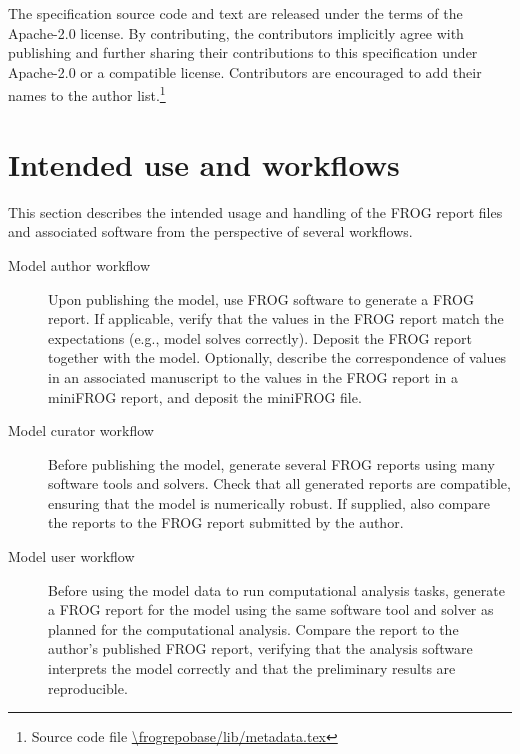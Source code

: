 The specification source code and text are released under the terms of the Apache-2.0 license.
By contributing, the contributors implicitly agree with publishing and further sharing their contributions to this specification under Apache-2.0 or a compatible license.
Contributors are encouraged to add their names to the author list.\footnote{Source code file \url{\frogrepobase/lib/metadata.tex}}

\section{Intended use and workflows}

This section describes the intended usage and handling of the FROG report files and associated software from the perspective of several workflows.

\begin{description}
\item[Model author workflow] Upon publishing the model, use FROG software to generate a FROG report.
If applicable, verify that the values in the FROG report match the expectations (e.g., model solves correctly).
Deposit the FROG report together with the model.
Optionally, describe the correspondence of values in an associated manuscript to the values in the FROG report in a miniFROG report, and deposit the miniFROG file.
\item[Model curator workflow] Before publishing the model, generate several FROG reports using many software tools and solvers.
Check that all generated reports are compatible, ensuring that the model is numerically robust.
If supplied, also compare the reports to the FROG report submitted by the author.
\item[Model user workflow] Before using the model data to run computational analysis tasks, generate a FROG report for the model using the same software tool and solver as planned for the computational analysis.
Compare the report to the author's published FROG report, verifying that the analysis software interprets the model correctly and that the preliminary results are reproducible.
\end{description}

